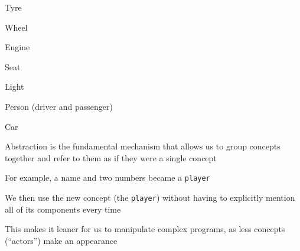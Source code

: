 \documentclass{beamer}
\begin{document}
\begin{slide}{
\item Tyre
\item Wheel
\item Engine
\item Seat
\item Light
\item Person (driver and passenger)
\item Car
}\end{slide}

\begin{slide}{
\item Abstraction is the fundamental mechanism that allows us to group concepts together and refer to them as if they were a single concept
\item For example, a name and two numbers became a \texttt{player}
\item We then use the new concept (the \texttt{player}) without having to explicitly mention all of its components every time
\item This makes it leaner for us to manipulate complex programs, as less concepts (``actors'') make an appearance
}\end{slide}

\begin{thankyou}
\end{thankyou}
\end{document}
